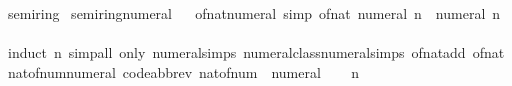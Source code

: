 \begin{isabellebody}
{\isafoldproof}%
%
\isadelimproof
\isanewline
%
\endisadelimproof
\isanewline
{}\isamarkupfalse%
%
\isadelimdocument
%
\endisadelimdocument
%
\isatagdocument
%
\isamarkuptrue%
%
\endisatagdocument
{\isafolddocument}%
%
\isadelimdocument
%
\endisadelimdocument
{}\isamarkupfalse%
\ semiring{\isacharunderscore}{\kern0pt}{}\isanewline
{}\isanewline
\isanewline
{}\isamarkupfalse%
\ semiring{\isacharunderscore}{\kern0pt}numeral%
\isadelimproof
\ %
\endisadelimproof
%
\isatagproof
\isacommand{{\isachardot}{\kern0pt}{\isachardot}{\kern0pt}}\isamarkupfalse%
%
\endisatagproof
{\isafoldproof}%
%
\isadelimproof
%
\endisadelimproof
\isanewline
\isanewline
{}\isamarkupfalse%
\ of{\isacharunderscore}{\kern0pt}nat{\isacharunderscore}{\kern0pt}numeral\ {\isacharbrackleft}{\kern0pt}simp{\isacharbrackright}{\kern0pt}{\isacharcolon}{\kern0pt}\ {\isachardoublequoteopen}of{\isacharunderscore}{\kern0pt}nat\ {\isacharparenleft}{\kern0pt}numeral\ n{\isacharparenright}{\kern0pt}\ {\isacharequal}{\kern0pt}\ numeral\ n{\isachardoublequoteclose}\isanewline
%
\isadelimproof
\ \ %
\endisadelimproof
%
\isatagproof
{}\isamarkupfalse%
\ {\isacharparenleft}{\kern0pt}induct\ n{\isacharparenright}{\kern0pt}\ {\isacharparenleft}{\kern0pt}simp{\isacharunderscore}{\kern0pt}all\ only{\isacharcolon}{\kern0pt}\ numeral{\isachardot}{\kern0pt}simps\ numeral{\isacharunderscore}{\kern0pt}class{\isachardot}{\kern0pt}numeral{\isachardot}{\kern0pt}simps\ of{\isacharunderscore}{\kern0pt}nat{\isacharunderscore}{\kern0pt}add\ of{\isacharunderscore}{\kern0pt}nat{\isacharunderscore}{\kern0pt}{}{\isacharparenright}{\kern0pt}%
\endisatagproof
{\isafoldproof}%
%
\isadelimproof
\isanewline
%
\endisadelimproof
\isanewline
{}\isamarkupfalse%
\isanewline
\isanewline
{}\isamarkupfalse%
\ nat{\isacharunderscore}{\kern0pt}of{\isacharunderscore}{\kern0pt}num{\isacharunderscore}{\kern0pt}numeral\ {\isacharbrackleft}{\kern0pt}code{\isacharunderscore}{\kern0pt}abbrev{\isacharbrackright}{\kern0pt}{\isacharcolon}{\kern0pt}\ {\isachardoublequoteopen}nat{\isacharunderscore}{\kern0pt}of{\isacharunderscore}{\kern0pt}num\ {\isacharequal}{\kern0pt}\ numeral{\isachardoublequoteclose}\isanewline
%
\isadelimproof
%
\endisadelimproof
%
\isatagproof
{}\isamarkupfalse%
\isanewline
\ \ \isamarkupfalse%
\ n\isanewline
\ \ \isamarkupfalse%

\end{isabellebody}
